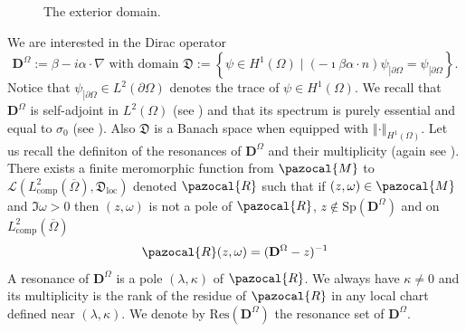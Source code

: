 \documentclass[a4paper, 12pt]{amsart}
\numberwithin{equation}{section}
\newcommand{\R}{\mathbb{R}} %
\newcommand{\loc}{\mathrm{loc}} %
\newcommand{\comp}{\mathrm{comp}} %
\newcommand{\Sp}{\mathrm{Sp}} %
\newcommand{\Res}{\mathrm{Res}} %
\newcommand{\lcb}{\left\lbrace} %
\newcommand{\rcb}{\right\rbrace} %
\newcommand{\lV}{\left\Vert} %
\newcommand{\rV}{\right\Vert} %
\newcommand{\Dvec}{\mathbf{D}}
\newcommand{\Lcal}{\mathcal{L}}
\newcommand{\Mpaz}{\pazocal{M}}
\newcommand{\Rpaz}{\pazocal{R}}
\newcommand{\Dfrak}{\mathfrak{D}}
\DeclareMathOperator{\tq}{\mathrm{ | }} %
\begin{document}
\begin{figure}[htbp]
    \centering
    \caption{The exterior domain.}
    \label{FigureObstacle}
\end{figure}

We are interested in the Dirac operator 
\begin{equation}\label{MIT}
    \Dvec^\Omega:=\beta-i\alpha\cdot\nabla \mbox{ with domain } \Dfrak:=\lcb\psi\in H^1(\Omega)\tq (-\imath\beta\alpha\cdot n)\psi_{\tq\partial\Omega}=\psi_{\tq\partial\Omega}\rcb.
\end{equation}
Notice that $\psi_{\tq\partial\Omega}\in L^2(\partial\Omega)$ denotes the trace of $\psi\in H^1(\Omega)$. We recall that $\Dvec^\Omega$ is self-adjoint in $L^2(\Omega)$ (see \cite[Theorem 3.2]{OuVe18}) and that its spectrum is purely essential and equal to $\sigma_0$ (see \cite[Theorem 3.1]{BeBrZr24}). Also $\Dfrak$ is a Banach space when equipped with $\lV\cdot\rV_{H^1(\Omega)}$. Let us recall the definiton of the resonances of $\Dvec^\Omega$ and their multiplicity (again see \cite{Du25}). There exists a finite meromorphic function from $\Mpaz$ to $\Lcal(L^2_\comp(\overline{\Omega}),\Dfrak_\loc)$ denoted $\Rpaz$ such that if $(z,\omega)\in\Mpaz$ and $\Im\omega>0$ then $(z,\omega)$ is not a pole of $\Rpaz$, $z\not\in\Sp(\Dvec^\Omega)$ and on $L^2_\comp(\overline{\Omega})$
\begin{equation}\label{MITResolventContinuation}
    \Rpaz(z,\omega)=(\Dvec^\Omega-z)^{-1}    
\end{equation}
A resonance of $\Dvec^\Omega$ is a pole $(\lambda,\kappa)$ of $\Rpaz$. We always have $\kappa\not=0$ and its multiplicity is the rank of the residue of $\Rpaz$ in any local chart defined near $(\lambda,\kappa)$. We denote by $\Res(\Dvec^\Omega)$ the resonance set of $\Dvec^\Omega$.
\end{document}
